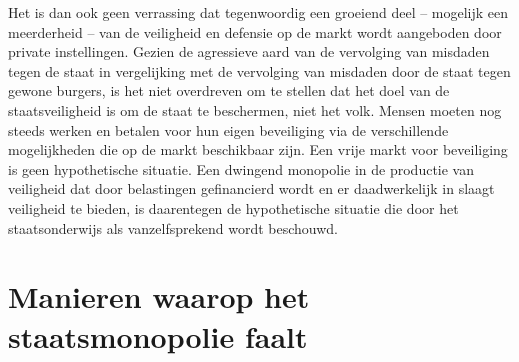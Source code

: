 \documentclass[
  a5paper,
  smalldemyvopaper,11pt,twoside,onecolumn,openright,extrafontsizes,
hidelinks]{memoir}
\begin{document}
Het is dan ook geen verrassing dat tegenwoordig een groeiend deel --
mogelijk een meerderheid -- van de veiligheid en defensie op de markt
wordt aangeboden door private instellingen. Gezien de agressieve aard
van de vervolging van misdaden tegen de staat in vergelijking met de
vervolging van misdaden door de staat tegen gewone burgers, is het niet
overdreven om te stellen dat het doel van de staatsveiligheid is om de
staat te beschermen, niet het volk. Mensen moeten nog steeds werken en
betalen voor hun eigen beveiliging via de verschillende mogelijkheden
die op de markt beschikbaar zijn. Een vrije markt voor beveiliging is
geen hypothetische situatie. Een dwingend monopolie in de productie van
veiligheid dat door belastingen gefinancierd wordt en er daadwerkelijk
in slaagt veiligheid te bieden, is daarentegen de hypothetische situatie
die door het staatsonderwijs als vanzelfsprekend wordt beschouwd.

\section{Manieren waarop het staatsmonopolie
faalt}\label{manieren-waarop-het-staatsmonopolie-faalt}
\end{document}

